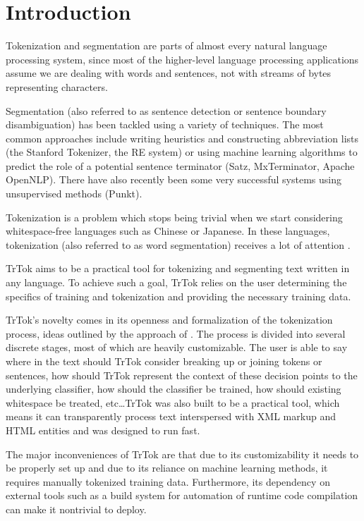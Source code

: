 \section{Introduction}
\label{sec:introduction}

Tokenization and segmentation are parts of almost every natural
language processing system, since most of the higher-level language
processing applications assume we are dealing with words and
sentences, not with streams of bytes representing characters.

Segmentation (also referred to as sentence detection or sentence
boundary disambiguation) has been tackled using a variety of
techniques. The most common approaches include writing heuristics and
constructing abbreviation lists (the Stanford Tokenizer, the RE
system) or using machine learning algorithms to predict the role of a
potential sentence terminator (Satz, MxTerminator, Apache OpenNLP).
There have also recently been some very successful systems using
unsupervised methods (Punkt).

Tokenization is a problem which stops being trivial when we start
considering whitespace-free languages such as Chinese or Japanese. In
these languages, tokenization (also referred to as word segmentation)
receives a lot of attention \cite{seg-bakeoff}.

TrTok aims to be a practical tool for tokenizing and segmenting text
written in any language. To achieve such a goal, TrTok relies on the
user determining the specifics of training and tokenization and
providing the necessary training data.

TrTok's novelty comes in its openness and formalization of the
tokenization process, ideas outlined by the approach of
. The process is divided into several discrete
stages, most of which are heavily customizable. The user is able to
say where in the text should TrTok consider breaking up or joining
tokens or sentences, how should TrTok represent the context of these
decision points to the underlying classifier, how should the
classifier be trained, how should existing whitespace be treated,
etc\ldots TrTok was also built to be a practical tool, which means it
can transparently process text interspersed with XML markup and HTML
entities and was designed to run fast.

The major inconveniences of TrTok are that due to its customizability
it needs to be properly set up and due to its reliance on machine
learning methods, it requires manually tokenized training data.
Furthermore, its dependency on external tools such as a build system
for automation of runtime code compilation can make it nontrivial to
deploy.

